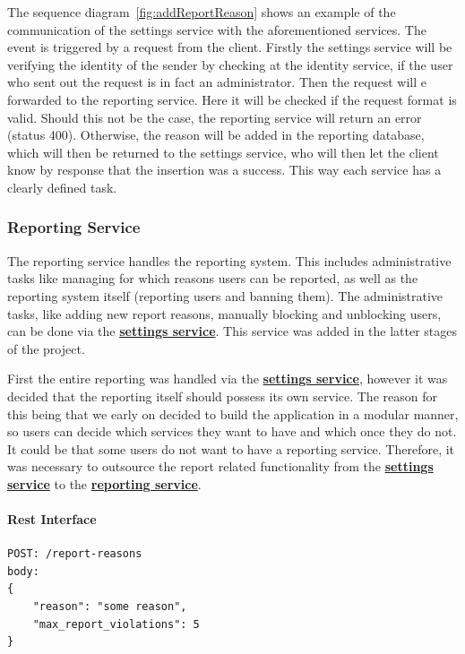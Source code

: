 The sequence diagram~\ref{fig:addReportReason} shows an example of the communication of the settings service with the
aforementioned services.
The event is triggered by a request from the client.
Firstly the settings service will be verifying the identity of the sender by checking at the identity service, if the
user who sent out the request is in fact an administrator.
Then the request will e forwarded to the reporting service.
Here it will be checked if the request format is valid.
Should this not be the case, the reporting service will return an error (status 400).
Otherwise, the reason will be added in the reporting database, which will then be returned to the settings service,
who will then let the client know by response that the insertion was a success.
This way each service has a clearly defined task.

\subsubsection{Reporting Service}\label{subsubsec:reportingSer}

The reporting service handles the reporting system.
This includes administrative tasks like managing for which reasons users can be reported, as well as the reporting
system itself (reporting users and banning them).
The administrative tasks, like adding new report reasons, manually blocking and unblocking users, can be done via the
\hyperref[subsubsec:settingsSer]{\textbf{settings service}}.
This service was added in the latter stages of the project.

First the entire reporting was handled via the \hyperref[subsubsec:settingsSer]{\textbf{settings service}}, however it
was decided that the reporting itself should possess its own service.
The reason for this being that we early on decided to build the application in a modular manner, so users can decide
which services they want to have and which once they do not.
It could be that some users do not want to have a reporting service.
Therefore, it was necessary to outsource the report related functionality from the
\hyperref[subsubsec:settingsSer]{\textbf{settings service}} to the
\hyperref[subsubsec:reportingSer]{\textbf{reporting service}}.

\paragraph{Rest Interface}
\begin{lstlisting}[label={lst:lstlisting7}]
POST: /report-reasons
body:
{
    "reason": "some reason",
    "max_report_violations": 5
}
\end{lstlisting}

